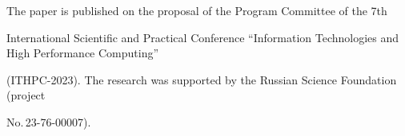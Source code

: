 









\vspace*{-10pt}



\Ack



\vspace*{-3pt}



\noindent

 The paper is published on the proposal of the Program Committee of the 7th

  International Scientific and Practical Conference ``Information Technologies and High Performance Computing'' 

  (ITHPC-2023). The research was supported by the Russian Science Foundation (project 

No.\,23-76-00007).








\renewcommand{\bibname}{\protect\rmfamily References}




